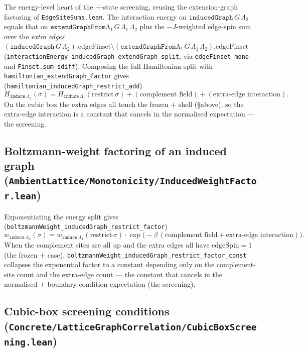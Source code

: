 \documentclass[a4paper,11pt]{article}
\begin{document}
The energy-level heart of the $+$-state screening, reusing the extension-graph
factoring of \texttt{EdgeSiteSums.lean}. The interaction energy on
$\texttt{inducedGraph}\,G\,\Lambda_2$ equals that on
$\texttt{extendGraphFromΛ₁}\,G\,\Lambda_1\,\Lambda_2$ plus the $-J$-weighted
edge-spin sum over the \emph{extra edges}
$(\texttt{inducedGraph}\,G\,\Lambda_2).\mathrm{edgeFinset} \setminus
(\texttt{extendGraphFromΛ₁}\,G\,\Lambda_1\,\Lambda_2).\mathrm{edgeFinset}$
(\texttt{interactionEnergy\_inducedGraph\_extendGraph\_split}, via
\texttt{edgeFinset\_mono} and \texttt{Finset.sum\_sdiff}). Composing the full
Hamiltonian split with \texttt{hamiltonian\_extendGraph\_factor} gives
(\texttt{hamiltonian\_inducedGraph\_restrict\_add})
\[
  H_{\texttt{induce}\,\Lambda_2}(\sigma)
    = H_{\texttt{induce}\,\Lambda_1}(\mathrm{restrict}\,\sigma)
      + (\text{complement field}) + (\text{extra-edge interaction}).
\]
On the cubic box the extra edges all touch the frozen $+$ shell (\S above), so the
extra-edge interaction is a constant that cancels in the normalised expectation
--- the screening.

\subsection{Boltzmann-weight factoring of an induced graph
(\texttt{AmbientLattice/Monotonicity/InducedWeightFactor.lean})}

Exponentiating the energy split gives
(\texttt{boltzmannWeight\_inducedGraph\_restrict\_factor})
\[
  w_{\texttt{induce}\,\Lambda_2}(\sigma)
    = w_{\texttt{induce}\,\Lambda_1}(\mathrm{restrict}\,\sigma)
      \cdot \exp\!\big(-\beta\,(\text{complement field} + \text{extra-edge
      interaction})\big).
\]
When the complement sites are all $\mathrm{up}$ and the extra edges all have
$\mathrm{edgeSpin} = 1$ (the frozen $+$ case),
\texttt{boltzmannWeight\_inducedGraph\_restrict\_factor\_const} collapses the
exponential factor to a constant depending only on the complement-site count and
the extra-edge count --- the constant that cancels in the normalised $+$
boundary-condition expectation (the screening).

\subsection{Cubic-box screening conditions
(\texttt{Concrete/LatticeGraphCorrelation/CubicBoxScreening.lean})}
\end{document}
